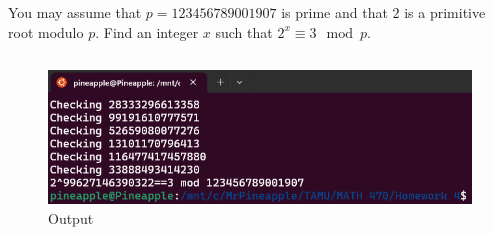 \documentclass[12pt]{article}
\begin{document}
\newpage
\problem You may assume that $p=123456789001907$ is prime and that $2$ is a primitive root modulo $p$. Find an integer $x$ such that $2^x\equiv3\mod{p}$.

\solution
{}
\inputminted{py}{lsbs.py}

\begin{figure}[!ht]
    \centering
    \includegraphics[width=\textwidth]{Question 7.png}
    \caption{Output}
\end{figure}
\end{document}
